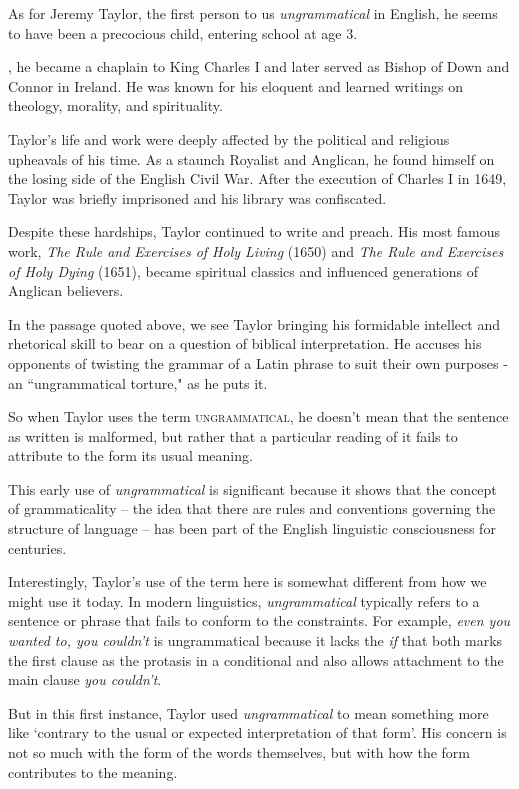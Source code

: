 \bigskip

As for Jeremy Taylor, the first person to us \textit{ungrammatical} in English, he seems to have been a precocious child, entering school at age 3. 

, he became a chaplain to King Charles I and later served as Bishop of Down and Connor in Ireland. He was known for his eloquent and learned writings on theology, morality, and spirituality.

Taylor's life and work were deeply affected by the political and religious upheavals of his time. As a staunch Royalist and Anglican, he found himself on the losing side of the English Civil War. After the execution of Charles I in 1649, Taylor was briefly imprisoned and his library was confiscated.

Despite these hardships, Taylor continued to write and preach. His most famous work, \textit{The Rule and Exercises of Holy Living} (1650) and \textit{The Rule and Exercises of Holy Dying} (1651), became spiritual classics and influenced generations of Anglican believers.

In the passage quoted above, we see Taylor bringing his formidable intellect and rhetorical skill to bear on a question of biblical interpretation. He accuses his opponents of twisting the grammar of a Latin phrase to suit their own purposes - an ``ungrammatical torture," as he puts it.

So when Taylor uses the term \textsc{ungrammatical}, he doesn't mean that the sentence as written is malformed, but rather that a particular reading of it fails to attribute to the form its usual meaning.

This early use of \textit{ungrammatical} is significant because it shows that the concept of grammaticality -- the idea that there are rules and conventions governing the structure of language -- has been part of the English linguistic consciousness for centuries.

Interestingly, Taylor's use of the term here is somewhat different from how we might use it today. In modern linguistics, \textit{ungrammatical} typically refers to a sentence or phrase that fails to conform to the constraints. For example, \textit{even you wanted to, you couldn't} is ungrammatical because it lacks the \textit{if} that both marks the first clause as the protasis in a conditional and also allows attachment to the main clause \textit{you couldn't}.

But in this first instance, Taylor used \textit{ungrammatical} to mean something more like `contrary to the usual or expected interpretation of that form'. His concern is not so much with the form of the words themselves, but with how the form contributes to the meaning.

